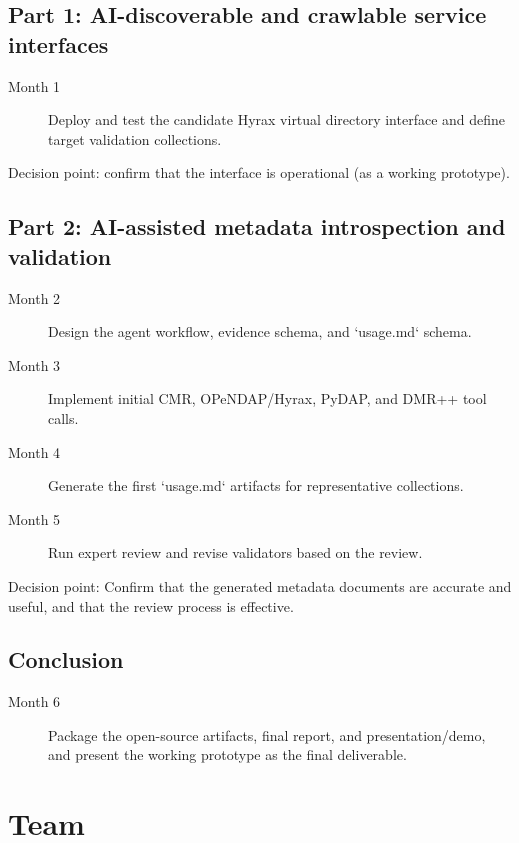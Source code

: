 \documentclass[11pt]{article}
\begin{document}
\subsection*{Part 1: AI-discoverable and crawlable service interfaces} 
\begin{description}
    \item [Month 1] Deploy and test the candidate Hyrax virtual directory interface
 and define target validation collections. 
\end{description}

Decision point: confirm that the interface is operational (as a working
prototype).

\subsection*{Part 2: AI-assisted metadata introspection and validation} 
\begin{description}
    \item [Month 2] Design the agent workflow, evidence schema, and `usage.md` schema.
    \item [Month 3] Implement initial \ac{CMR}, \acs{OPeNDAP}/Hyrax, \ac{PyDAP}, and \ac{DMR++} tool calls.
    \item [Month 4] Generate the first `usage.md` artifacts for representative
    collections. 
    \item [Month 5] Run expert review and revise validators based on the review. 
\end{description}
   
Decision point: Confirm that the generated metadata documents are accurate and
useful, and that the review process is effective.

\subsection*{Conclusion} 
\begin{description}
   
    \item [Month 6] Package the open-source artifacts, final report, and presentation/demo, and
present the working prototype as the final deliverable. 
 
\end{description}

\section{Team}
\end{document}
